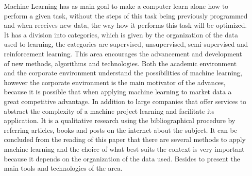 \noindent
Machine Learning has as main goal to make a 
computer learn alone how to perform a given task, without the steps of this task being previously programmed
and when receives new data, the way how it performs this task will be optimized. 
It has a division into categories, which is given by the organization of the data used to learning, the categories are
supervised, unsupervised, semi-supervised and reinforcement learning.
\noindent
This area encourages the advancement and development of new methods, algorithms and technologies. Both the academic environment 
and the corporate environment understand the possibilities of machine learning, however the corporate environment is 
the main motivator of the advances, because it is possible that when applying machine learning to market data a 
great competitive advantage. In addition to large companies that offer services to abstract the complexity of a 
machine project learning and facilitate its application.
\noindent
It is a qualitative research using the bibliographical procedure by referring articles, books and posts on the internet
about the subject. It can be concluded from the reading of this paper that there are several
methods to apply machine learning and the choice of what best suits the context is very important because it depends on the 
organization of the data used. Besides to present the main tools and technologies of the area.

\newpage    